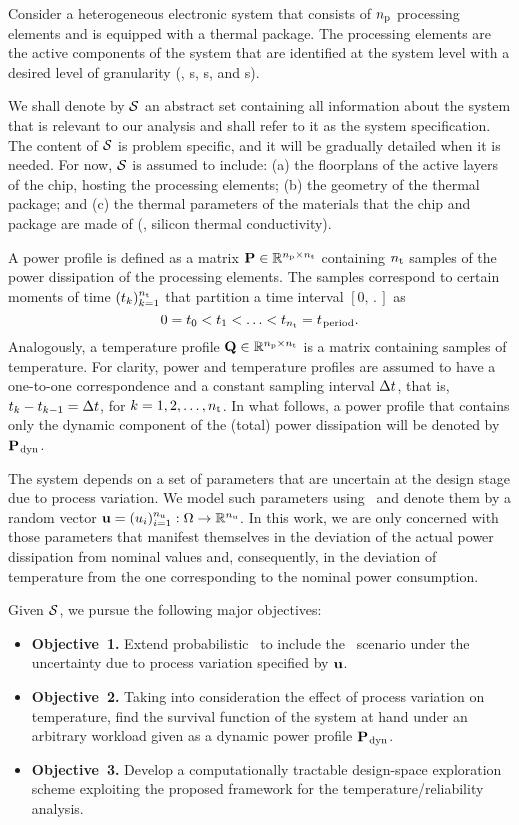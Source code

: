 Consider a heterogeneous electronic system that consists of ${n_\text{p}}$ processing elements and is equipped with a thermal package.
The processing elements are the active components of the system that are identified at the system level with a desired level of granularity (\eg, s, s, and s).

We shall denote by $\mathcal{S}$ an abstract set containing all information about the system that is relevant to our analysis and shall refer to it as the system specification.
The content of $\mathcal{S}$ is problem specific, and it will be gradually detailed when it is needed.
For now, $\mathcal{S}$ is assumed to include: (a) the floorplans of the active layers of the chip, hosting the processing elements; (b) the geometry of the thermal package; and (c) the thermal parameters of the materials that the chip and package are made of (\eg, silicon thermal conductivity).

A power profile is defined as a matrix $\mathbf{P} \in \mathbb{R}^{{n_\text{p}} \times {n_\text{t}}}$ containing ${n_\text{t}}$ samples of the power dissipation of the processing elements.
The samples correspond to certain moments of time $(t_k)_{k = 1}^{n_\text{t}}$ that partition a time interval $[0, \period]$ as
\[
  0 = t_0 < t_1 < \dotsc < t_{n_\text{t}} = t_{\text{\kern0.1emperiod}}.
\]
Analogously, a temperature profile $\mathbf{Q} \in \mathbb{R}^{{n_\text{p}} \times {n_\text{t}}}$ is a matrix containing samples of temperature.
For clarity, power and temperature profiles are assumed to have a one-to-one correspondence and a constant sampling interval $\Delta t$, that is, $t_k - t_{k - 1} = \Delta t$, for $k = 1, 2, \dots, {n_\text{t}}$.
In what follows, a power profile that contains only the dynamic component of the (total) power dissipation will be denoted by $\mathbf{P}_{\text{\kern0.1emdyn}}$.

The system depends on a set of parameters that are uncertain at the design stage due to process variation.
We model such parameters using \rvs\ and denote them by a random vector $\mathbf{u} = (u_i)_{i = 1}^{n_\text{u}}: \Omega \to \mathbb{R}^{n_\text{u}}$.
In this work, we are only concerned with those parameters that manifest themselves in the deviation of the actual power dissipation from nominal values and, consequently, in the deviation of temperature from the one corresponding to the nominal power consumption.

Given $\mathcal{S}$, we pursue the following major objectives:
\begin{itemize}
  \item {\bfseries Objective~1.} Extend probabilistic \ta\ to include the \DSS\ scenario under the uncertainty due to process variation specified by $\mathbf{u}$.
  \item {\bfseries Objective~2.} Taking into consideration the effect of process variation on temperature, find the survival function of the system at hand under an arbitrary workload given as a dynamic power profile $\mathbf{P}_{\text{\kern0.1emdyn}}$.
  \item {\bfseries Objective~3.} Develop a computationally tractable design-space exploration scheme exploiting the proposed framework for the temperature/reliability analysis.
\end{itemize}

